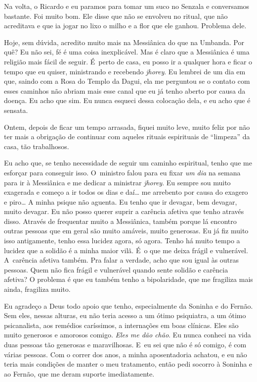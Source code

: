 Na volta, o Ricardo e eu paramos para tomar um suco no Senzala e
conversamos bastante. Foi muito bom. Ele disse que não se envolveu no
ritual, que não acreditava e que ia jogar no lixo o milho e a flor que
ele ganhou. Problema dele.

Hoje, sem dúvida, acredito muito mais na Messiânica do que na Umbanda.
Por quê? Eu não sei, fé é uma coisa inexplicável. Mas é claro que a
Messiânica é uma religião mais fácil de seguir. É~perto de casa, eu
posso ir a qualquer hora e ficar o tempo que eu quiser, ministrando e
recebendo \emph{jhorey}. Eu lembrei de um dia em que, saindo com a Rosa
do Templo da Dagui, ela me perguntou se o contato com esses caminhos não
abriam mais esse canal que eu já tenho aberto por causa da doença. Eu
acho que sim. Eu nunca esqueci dessa colocação dela, e eu acho que é
sensata.

Ontem, depois de ficar um tempo arrasada, fiquei muito leve, muito feliz
por não ter mais a obrigação de continuar com aqueles rituais
espirituais de ``limpeza'' da casa, tão trabalhosos.

Eu acho que, se tenho necessidade de seguir um caminho espiritual, tenho
que me esforçar para conseguir isso. O~ministro falou para eu fixar
\emph{um dia} na semana para ir à Messiânica e me dedicar a ministrar
\emph{jhorey}. Eu sempre sou muito exagerada e começo a ir todos os dias
e daí… me arrebento por causa do exagero e piro… A minha
psique não aguenta. Eu tenho que ir devagar, bem devagar, muito devagar.
Eu não posso querer suprir a carência afetiva que tenho através disso.
Através de frequentar muito a Messiânica, também porque lá encontro
outras pessoas que em geral são muito amáveis, muito generosas. Eu já
fiz muito isso antigamente, tenho essa lucidez agora, só agora. Tenho há
muito tempo a lucidez que a solidão é a minha maior vilã. É~o que me
deixa frágil e vulnerável. A~carência afetiva também. Pra falar a
verdade, acho que sou igual às outras pessoas. Quem não fica frágil e
vulnerável quando sente solidão e carência afetiva? O problema é que eu
também tenho a bipolaridade, que me fragiliza mais ainda, fragiliza
muito.

Eu agradeço a Deus todo apoio que tenho, especialmente da Soninha e do
Fernão. Sem eles, nessas alturas, eu não teria acesso a um ótimo
psiquiatra, a um ótimo psicanalista, aos remédios caríssimos, a
internações em boas clínicas. Eles são muito generosos e amorosos
comigo. \emph{Eles me dão chão}. Eu nunca conheci na vida duas pessoas
tão generosas e maravilhosas. E~eu sei que não é só comigo, é com várias
pessoas. Com o correr dos anos, a minha aposentadoria achatou, e eu não
teria mais condições de manter o meu tratamento, então pedi socorro à
Soninha e ao Fernão, que me deram suporte imediatamente.

